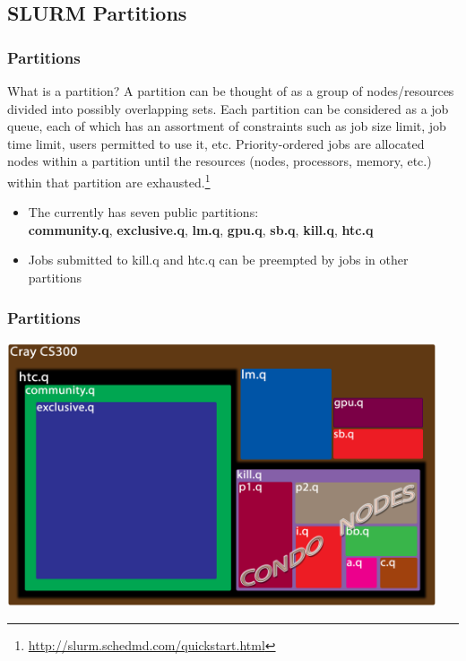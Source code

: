 \subsection{SLURM Partitions}
\begin{frame}
\footnotesize
\frametitle{Partitions}
\begin{block}{What is a partition?}\footnotesize
A partition can be thought of as a group of nodes/resources divided into possibly overlapping sets.  Each partition can be considered as a job queue, each of which has an assortment of constraints such as job size limit, job time limit, users permitted to use it, etc. Priority-ordered jobs are allocated nodes within a partition until the resources (nodes, processors, memory, etc.) within that partition are exhausted.\footnote{\label{schedmd_qstart}\tiny \url{http://slurm.schedmd.com/quickstart.html}}
\end{block}
\begin{itemize}
	\item The {\craycs} currently has seven public partitions:~\\\textbf{community.q}, \textbf{exclusive.q}, \textbf{lm.q}, \textbf{gpu.q}, \textbf{sb.q}, \textbf{kill.q}, \textbf{htc.q}
	\item Jobs submitted to kill.q and htc.q can be preempted by jobs in other partitions
\end{itemize}
\end{frame}

\begin{frame}
\frametitle{Partitions}
\includegraphics[width=0.95\textwidth]{images/partitions}
\end{frame}

